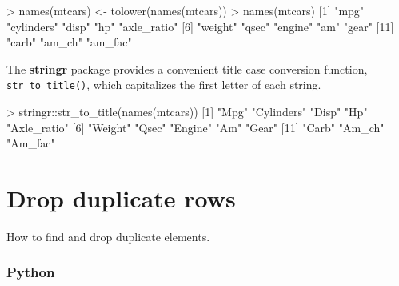 \documentclass[
]{book}
\newenvironment{Shaded}{\begin{snugshade}}{\end{snugshade}}
\newcommand{\DecValTok}[1]{\textcolor[rgb]{0.00,0.00,0.81}{#1}}
\newcommand{\FunctionTok}[1]{\textcolor[rgb]{0.00,0.00,0.00}{#1}}
\newcommand{\NormalTok}[1]{#1}
\newcommand{\OtherTok}[1]{\textcolor[rgb]{0.56,0.35,0.01}{#1}}
\newcommand{\SpecialCharTok}[1]{\textcolor[rgb]{0.00,0.00,0.00}{#1}}
\newcommand{\StringTok}[1]{\textcolor[rgb]{0.31,0.60,0.02}{#1}}
\begin{document}
\begin{Shaded}
\begin{Highlighting}[]
\SpecialCharTok{\textgreater{}} \FunctionTok{names}\NormalTok{(mtcars) }\OtherTok{\textless{}{-}} \FunctionTok{tolower}\NormalTok{(}\FunctionTok{names}\NormalTok{(mtcars))}
\SpecialCharTok{\textgreater{}} \FunctionTok{names}\NormalTok{(mtcars)}
\NormalTok{ [}\DecValTok{1}\NormalTok{] }\StringTok{"mpg"}        \StringTok{"cylinders"}  \StringTok{"disp"}       \StringTok{"hp"}         \StringTok{"axle\_ratio"}
\NormalTok{ [}\DecValTok{6}\NormalTok{] }\StringTok{"weight"}     \StringTok{"qsec"}       \StringTok{"engine"}     \StringTok{"am"}         \StringTok{"gear"}      
\NormalTok{[}\DecValTok{11}\NormalTok{] }\StringTok{"carb"}       \StringTok{"am\_ch"}      \StringTok{"am\_fac"}    
\end{Highlighting}
\end{Shaded}

The \textbf{stringr} package provides a convenient title case conversion function, \texttt{str\_to\_title()}, which capitalizes the first letter of each string.

\begin{Shaded}
\begin{Highlighting}[]
\SpecialCharTok{\textgreater{}}\NormalTok{ stringr}\SpecialCharTok{::}\FunctionTok{str\_to\_title}\NormalTok{(}\FunctionTok{names}\NormalTok{(mtcars))}
\NormalTok{ [}\DecValTok{1}\NormalTok{] }\StringTok{"Mpg"}        \StringTok{"Cylinders"}  \StringTok{"Disp"}       \StringTok{"Hp"}         \StringTok{"Axle\_ratio"}
\NormalTok{ [}\DecValTok{6}\NormalTok{] }\StringTok{"Weight"}     \StringTok{"Qsec"}       \StringTok{"Engine"}     \StringTok{"Am"}         \StringTok{"Gear"}      
\NormalTok{[}\DecValTok{11}\NormalTok{] }\StringTok{"Carb"}       \StringTok{"Am\_ch"}      \StringTok{"Am\_fac"}    
\end{Highlighting}
\end{Shaded}

\hypertarget{drop-duplicate-rows}{%
\section{Drop duplicate rows}\label{drop-duplicate-rows}}

How to find and drop duplicate elements.

\hypertarget{python-27}{%
\subsubsection*{Python}\label{python-27}}
\end{document}
